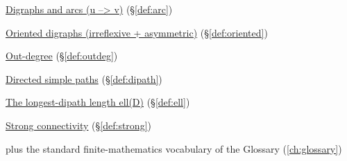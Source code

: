 \begin{closurepanel}
\item \hyperref[def:arc]{Digraphs and arcs (u --> v)} (\S\ref*{def:arc})
\item \hyperref[def:oriented]{Oriented digraphs (irreflexive + asymmetric)} (\S\ref*{def:oriented})
\item \hyperref[def:outdeg]{Out-degree} (\S\ref*{def:outdeg})
\item \hyperref[def:dipath]{Directed simple paths} (\S\ref*{def:dipath})
\item \hyperref[def:ell]{The longest-dipath length ell(D)} (\S\ref*{def:ell})
\item \hyperref[def:strong]{Strong connectivity} (\S\ref*{def:strong})
\item plus the standard finite-mathematics vocabulary of the Glossary (\cref{ch:glossary})
\end{closurepanel}

